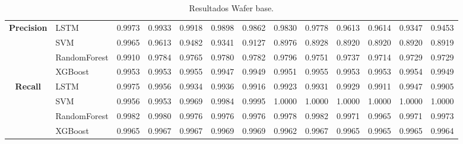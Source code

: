 \begin{table}[h]
\begin{adjustbox}{max width=15cm}
\begin{tabular}{|c|l|r|r|r|r|r|r|r|r|r|r|r|}
			\hline
			\textbf{Precision} & LSTM &  0.9973 &  0.9933 &  0.9918 &  0.9898 &  0.9862 &  0.9830 &  0.9778 &  0.9613 &  0.9614 &  0.9347 &  0.9453 \\
			& SVM &  0.9965 &  0.9613 &  0.9482 &  0.9341 &  0.9127 &  0.8976 &  0.8928 &  0.8920 &  0.8920 &  0.8920 &  0.8919 \\
			& RandomForest &  0.9910 &  0.9784 &  0.9765 &  0.9780 &  0.9782 &  0.9796 &  0.9751 &  0.9737 &  0.9714 &  0.9729 &  0.9729 \\
			& XGBoost &  0.9953 &  0.9953 &  0.9955 &  0.9947 &  0.9949 &  0.9951 &  0.9955 &  0.9953 &  0.9953 &  0.9954 &  0.9949 \\
			\hline
			\textbf{Recall} & LSTM &  0.9975 &  0.9956 &  0.9934 &  0.9936 &  0.9916 &  0.9923 &  0.9931 &  0.9929 &  0.9911 &  0.9947 &  0.9905 \\
			& SVM &  0.9956 &  0.9953 &  0.9969 &  0.9984 &  0.9995 &  1.0000 &  1.0000 &  1.0000 &  1.0000 &  1.0000 &  1.0000 \\
			& RandomForest &  0.9982 &  0.9980 &  0.9976 &  0.9976 &  0.9976 &  0.9978 &  0.9982 &  0.9971 &  0.9965 &  0.9971 &  0.9973 \\
			& XGBoost &  0.9965 &  0.9967 &  0.9967 &  0.9969 &  0.9969 &  0.9962 &  0.9967 &  0.9965 &  0.9965 &  0.9965 &  0.9964 \\
			\hline
		\end{tabular}
	\end{adjustbox}
	\caption{Resultados Wafer base.}
	\label{tab:Wafer_base}
\end{table}
\newpage
